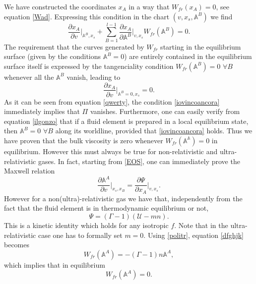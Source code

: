 \documentclass[useAMS,usenatbib,prd,twocolumn,nofootinbib]{revtex4-1}
\begin{document}
We have constructed the coordinates $x_A$ in a way that $W_{fr}(x_A)=0$, see equation \eqref{Wad}. Expressing this condition in the chart $(v,x_s,\mathbb{A}^B)$ we find
\begin{equation}\label{poiuyt}
\dfrac{\partial x_A}{\partial v} \bigg|_{\mathbb{A}^B, x_s} + \sum_{B=1}^{l-1} \dfrac{\partial x_A}{\partial \mathbb{A}^B} \bigg|_{v,x_s} W_{fr}(\mathbb{A}^B) =0. 
\end{equation}
The requirement that the curves generated by $W_{fr}$ starting in the equilibrium surface (given by the conditions $\mathbb{A}^B =0$) are entirely contained in the equilibrium surface itself is expressed by the 
tangenciality condition $W_{fr}(\mathbb{A}^B) =0$ $\forall B$ whenever all the $\mathbb{A}^B$ vanish, leading to
\begin{equation}\label{iovincoancora}
\dfrac{\partial x_A}{\partial v} \bigg|_{\mathbb{A}^B=0, x_s} =0.
\end{equation}
As it can be seen from equation \eqref{qwerty}, the condition \eqref{iovincoancora} immediately implies that $\Pi$ vanishes. Furthermore, one can easily verify from equation \eqref{ilgonzo} that if a fluid element is prepared in a local equilibrium state, then $\mathbb{A}^B=0$ $\forall B$ along its worldline, provided that \eqref{iovincoancora} holds. Thus we have proven that the bulk viscosity is zero whenever $W_{fr}(\mathbb{A^A})=0$ in equilibrium. However this must always be true for non-relativistic and ultra-relativistic gases. In fact, starting from \eqref{EOS}, one can immediately prove the Maxwell relation
\begin{equation}\label{dfghjk}
\dfrac{\partial \mathbb{A}^A}{\partial v} \bigg|_{x_s,x_B} = \dfrac{\partial \Psi}{\partial x_A} \bigg|_{v,x_s} .
\end{equation}
However for a non(ultra)-relativistic gas we have that, independently from the fact that the fluid element is in thermodynamic equilibrium or not,
\begin{equation}\label{politr}
\Psi = (\Gamma-1)(\mathcal{U}-mn).
\end{equation}
This is a kinetic identity which holds for any isotropic $f$. Note that in the ultra-relativistic case one has to formally set $m=0$. 
Using \eqref{politr}, equation \eqref{dfghjk} becomes
\begin{equation}
W_{fr}(\mathbb{A}^A) = -(\Gamma -1)n\mathbb{A}^A  ,
\end{equation}
which implies that in equilibrium
\begin{equation}
W_{fr}(\mathbb{A}^A) =0.
\end{equation}
\end{document}
